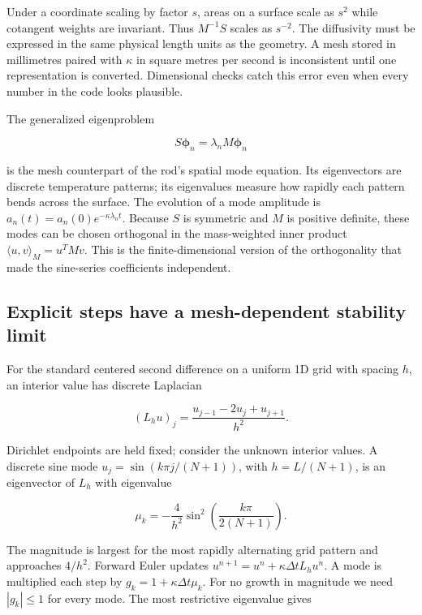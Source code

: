 Under a coordinate scaling by factor \(s\), areas on a surface scale as \(s^2\) while cotangent weights are invariant. Thus \(M^{-1}S\) scales as \(s^{-2}\). The diffusivity must be expressed in the same physical length units as the geometry. A mesh stored in millimetres paired with \(\kappa\) in square metres per second is inconsistent until one representation is converted. Dimensional checks catch this error even when every number in the code looks plausible.

The generalized eigenproblem

\[
S\boldsymbol\phi_n=\lambda_nM\boldsymbol\phi_n
\]

is the mesh counterpart of the rod's spatial mode equation. Its eigenvectors are discrete temperature patterns; its eigenvalues measure how rapidly each pattern bends across the surface. The evolution of a mode amplitude is \(a_n(t)=a_n(0)e^{-\kappa\lambda_nt}\). Because \(S\) is symmetric and \(M\) is positive definite, these modes can be chosen orthogonal in the mass-weighted inner product \(\langle u,v\rangle_M=u^TMv\). This is the finite-dimensional version of the orthogonality that made the sine-series coefficients independent.


\subsection{Explicit steps have a mesh-dependent stability limit}\label{04-visual-computing-ii-ch030-explicit-steps-have-a-mesh-dependent-stability-limit}

\hypertarget{04-visual-computing-ii-ch030-explicit-steps-have-a-mesh-dependent-stability-limit}{}

For the standard centered second difference on a uniform 1D grid with spacing \(h\), an interior value has discrete Laplacian

\[
(L_hu)_j=\frac{u_{j-1}-2u_j+u_{j+1}}{h^2}.
\]

Dirichlet endpoints are held fixed; consider the unknown interior values. A discrete sine mode \(u_j=\sin(k\pi j/(N+1))\), with \(h=L/(N+1)\), is an eigenvector of \(L_h\) with eigenvalue

\[
\mu_k=-\frac{4}{h^2}\sin^2\left(\frac{k\pi}{2(N+1)}\right).
\]

The magnitude is largest for the most rapidly alternating grid pattern and approaches \(4/h^2\). Forward Euler updates \(u^{n+1}=u^n+\kappa\Delta t L_hu^n\). A mode is multiplied each step by \(g_k=1+\kappa\Delta t\mu_k\). For no growth in magnitude we need \(|g_k|\le1\) for every mode. The most restrictive eigenvalue gives

